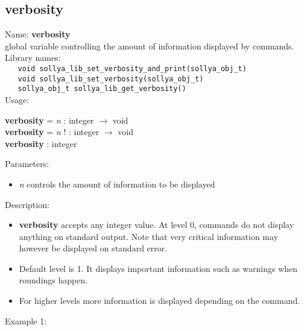 \subsection{verbosity}
\label{labverbosity}
\noindent Name: \textbf{verbosity}\\
\phantom{aaa}global variable controlling the amount of information displayed by commands.\\[0.2cm]
\noindent Library names:\\
\verb|   void sollya_lib_set_verbosity_and_print(sollya_obj_t)|\\
\verb|   void sollya_lib_set_verbosity(sollya_obj_t)|\\
\verb|   sollya_obj_t sollya_lib_get_verbosity()|\\[0.2cm]
\noindent Usage: 
\begin{center}
\textbf{verbosity} = \emph{n} : \textsf{integer} $\rightarrow$ \textsf{void}\\
\textbf{verbosity} = \emph{n} ! : \textsf{integer} $\rightarrow$ \textsf{void}\\
\textbf{verbosity} : \textsf{integer}\\
\end{center}
Parameters: 
\begin{itemize}
\item \emph{n} controls the amount of information to be displayed
\end{itemize}
\noindent Description: \begin{itemize}

\item \textbf{verbosity} accepts any integer value. At level 0, commands do not display anything
   on standard output. Note that very critical information may however be displayed on
   standard error.

\item Default level is 1. It displays important information such as warnings when 
   roundings happen.

\item For higher levels more information is displayed depending on the command.
\end{itemize}
\noindent Example 1: 
